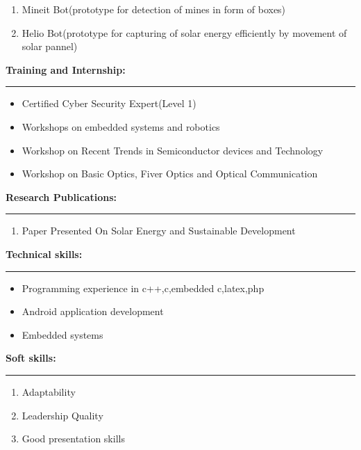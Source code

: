 \documentclass[a4paper,10pt]{article}
\begin{document}
\begin{flushleft}
\begin{enumerate}
      	\item  Mineit Bot(prototype for detection of mines in form of boxes)
      	\item  Helio Bot(prototype for capturing of solar energy efficiently by movement of solar pannel)
      \end{enumerate}
  \textbf{\large Training and Internship:}\\
  \hrule
   \begin{itemize}
   	\item  Certified Cyber Security Expert(Level 1) \\
   	\item  Workshops on embedded systems and robotics\\
   	\item  Workshop on Recent Trends in Semiconductor devices and Technology\\
   	\item  Workshop on Basic Optics, Fiver Optics and Optical Communication\\
   \end{itemize}
   \textbf{\large Research Publications:} \\ 
  \hrule
   \begin{enumerate}
   	\item  Paper Presented On Solar Energy and Sustainable Development \\
   \end{enumerate}
   \textbf{\large Technical skills:}\\
  \hrule
   \begin{itemize}
   	\item  Programming experience in c++,c,embedded c,latex,php \\
   	\item  Android application development\\
   	\item  Embedded systems\\
    \end{itemize}
     \newpage
  \textbf{\large Soft skills:}\\
  \hrule
    \begin{enumerate}
		\item Adaptability\\		
		\item Leadership Quality\\    	
    	\item Good presentation skills\\

\end{enumerate}
\end{flushleft}
\end{document}
